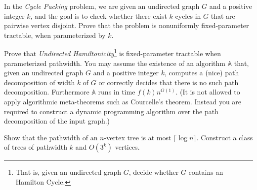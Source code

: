 \begin{exercise}[\easy]
In the \emph{Cycle Packing} problem, we are given an undirected graph $G$ and a positive integer $k$, and the goal is to check whether there exist $k$ cycles in $G$ that are pairwise vertex disjoint. Prove that the problem is nonuniformly fixed-parameter tractable, when parameterized by $k$.
\end{exercise}

\begin{exercise}
Prove that \emph{Undirected Hamiltonicity}\footnote{That is, given an undirected graph $G$, decide whether $G$ contains an Hamilton Cycle.} is fixed-parameter tractable when parameterized pathwidth. You may assume the existence of an algorithm $\mathbb{A}$ that, given an undirected graph $G$ and a positive integer $k$, computes a (nice) path decomposition of width $k$ of $G$ or correctly decides that there is no such path decomposition. Furthermore $\mathbb{A}$ runs in time $f(k) n^{O(1)}$. (It is not allowed to apply algorithmic meta-theorems such as Courcelle's theorem. Instead you are required to construct a dynamic programming algorithm over the path decomposition of the input graph.)
\end{exercise}


\begin{exercise}[\hard]
Show that the pathwidth of an $n$-vertex tree is at most $\lceil \log n \rceil$. Construct a class of trees of pathwidth $k$ and $O(3^k)$ vertices.
\end{exercise}